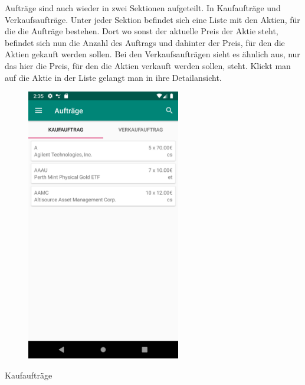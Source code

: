 \documentclass[10pt]{scrartcl}
\begin{document}
Aufträge sind auch wieder in zwei Sektionen aufgeteilt. In Kaufaufträge und Verkaufsaufträge. Unter jeder Sektion befindet sich eine Liste mit den Aktien, für die die Aufträge bestehen. Dort wo sonst der aktuelle Preis der Aktie steht, befindet sich nun die Anzahl des Auftrags und dahinter der Preis, für den die Aktien gekauft werden sollen. Bei den Verkaufsaufträgen sieht es ähnlich aus, nur das hier die Preis, für den die Aktien verkauft werden sollen, steht.
Klickt man auf die Aktie in der Liste gelangt man in ihre Detailansicht.

\begin{figure}[H]
	\centering
	\includegraphics[width=0.6\textwidth]{Bilder/Applikation/Kaufauftrag.png}
\end{figure}
Kaufaufträge
\end{document}
